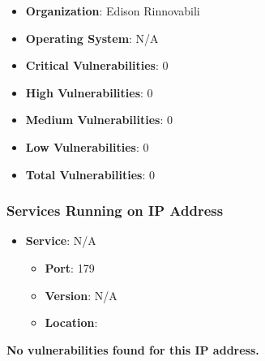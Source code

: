 \documentclass{article}
\begin{document}
\begin{itemize}
    \item \textbf{Organization}: Edison Rinnovabili
    \item \textbf{Operating System}:  N/A 
    \item \textbf{Critical Vulnerabilities}: 0
    \item \textbf{High Vulnerabilities}: 0
    \item \textbf{Medium Vulnerabilities}: 0
    \item \textbf{Low Vulnerabilities}: 0
    \item \textbf{Total Vulnerabilities}: 0
\end{itemize}

\subsubsection*{Services Running on IP Address}

\begin{itemize}
    
        \item \textbf{Service}: N/A
        \begin{itemize}
            \item \textbf{Port}: 179
            \item \textbf{Version}:  N/A 
            \item \textbf{Location}: \href{  }{  }
        \end{itemize}
    
\end{itemize}


\textbf{No vulnerabilities found for this IP address.}




\clearpage
\end{document}
